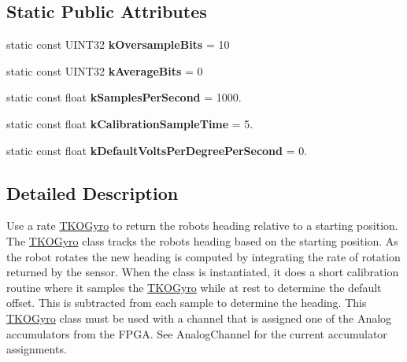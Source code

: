 \subsection*{Static Public Attributes}
\begin{DoxyCompactItemize}
\item 
\hypertarget{class_t_k_o_gyro_a794fe010f1390eb92d175ce8ace372fd}{static const U\-I\-N\-T32 {\bfseries k\-Oversample\-Bits} = 10}\label{class_t_k_o_gyro_a794fe010f1390eb92d175ce8ace372fd}

\item 
\hypertarget{class_t_k_o_gyro_a52e7e66f6fcdc4f9f34c0de39d88e427}{static const U\-I\-N\-T32 {\bfseries k\-Average\-Bits} = 0}\label{class_t_k_o_gyro_a52e7e66f6fcdc4f9f34c0de39d88e427}

\item 
\hypertarget{class_t_k_o_gyro_aa6e80a68440185d245310d30e714a9c7}{static const float {\bfseries k\-Samples\-Per\-Second} = 1000.}\label{class_t_k_o_gyro_aa6e80a68440185d245310d30e714a9c7}

\item 
\hypertarget{class_t_k_o_gyro_a0c74698b86f1125fac52fc9d3e2d4bf2}{static const float {\bfseries k\-Calibration\-Sample\-Time} = 5.}\label{class_t_k_o_gyro_a0c74698b86f1125fac52fc9d3e2d4bf2}

\item 
\hypertarget{class_t_k_o_gyro_aeb705e001e8af34a337ca38d178f386d}{static const float {\bfseries k\-Default\-Volts\-Per\-Degree\-Per\-Second} = 0.}\label{class_t_k_o_gyro_aeb705e001e8af34a337ca38d178f386d}

\end{DoxyCompactItemize}


\subsection{Detailed Description}
Use a rate \hyperlink{class_t_k_o_gyro}{T\-K\-O\-Gyro} to return the robots heading relative to a starting position. The \hyperlink{class_t_k_o_gyro}{T\-K\-O\-Gyro} class tracks the robots heading based on the starting position. As the robot rotates the new heading is computed by integrating the rate of rotation returned by the sensor. When the class is instantiated, it does a short calibration routine where it samples the \hyperlink{class_t_k_o_gyro}{T\-K\-O\-Gyro} while at rest to determine the default offset. This is subtracted from each sample to determine the heading. This \hyperlink{class_t_k_o_gyro}{T\-K\-O\-Gyro} class must be used with a channel that is assigned one of the Analog accumulators from the F\-P\-G\-A. See Analog\-Channel for the current accumulator assignments. 

